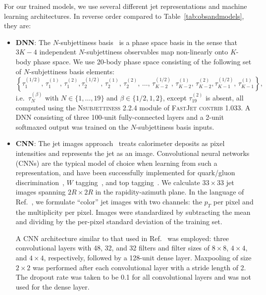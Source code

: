 \documentclass[letterpaper,11pt]{article}
\DeclareRobustCommand{\Tab}[1]{Table~\ref{#1}}
\DeclareRobustCommand{\Ref}[1]{Ref.~\cite{#1}}
\begin{document}
For our trained models, we use several different jet representations and machine learning architectures.
%
In reverse order compared to \Tab{tab:obsandmodels}, they are:
%
\begin{itemize}


\item \textbf{DNN}: The $N$-subjettiness basis~\cite{Datta:2017rhs} is a phase space basis in the sense that $3K-4$ independent $N$-subjettiness observables map non-linearly onto $K$-body phase space.
%
We use 20-body phase space consisting of the following set of $N$-subjettiness basis elements:
%
\begin{equation}
\left\{\tau_1^{(1/2)},\,\tau_1^{(1)},\,\tau_1^{(2)},\tau_2^{(1/2)},\,\tau_2^{(1)},\,\tau_2^{(2)},\,\ldots,\,\tau_{K-2}^{(1/2)},\,\tau_{K-2}^{(1)},\,\tau_{K-2}^{(2)},\tau_{K-1}^{(1/2)},\,\tau_{K-1}^{(1)}\right\},
\end{equation}
%
i.e.\ $\tau_N^{(\beta)}$ with $N\in\{1,\ldots,19\}$ and $\beta\in\{1/2,1,2\}$, except $\tau_{19}^{(2)}$ is absent, all computed using the \textsc{Nsubjettiness} 2.2.4 module of \textsc{FastJet contrib} 1.033.
%
A DNN consisting of three 100-unit fully-connected layers and a 2-unit softmaxed output was trained on the $N$-subjettiness basis inputs.


\item \textbf{CNN}: The jet images approach~\cite{Cogan:2014oua} treats calorimeter deposits as pixel intensities and represents the jet as an image. 
%
Convolutional neural networks (CNNs) are the typical model of choice when learning from such a representation, and have been successfully implemented for quark/gluon discrimination~\cite{Komiske:2016rsd}, $W$ tagging~\cite{deOliveira:2015xxd}, and top tagging~\cite{Baldi:2016fql,Guest:2016iqz}.
%
We calculate $33\times33$ jet images spanning $2R\times2R$ in the rapidity-azimuth plane.
%
In the language of \Ref{Komiske:2016rsd}, we formulate ``color'' jet images with two channels: the $p_T$ per pixel and the multiplicity per pixel.
%
Images were standardized by subtracting the mean and dividing by the per-pixel standard deviation of the training set.


A CNN architecture similar to that used in \Ref{Komiske:2016rsd} was employed: three convolutional layers with 48, 32, and 32 filters and filter sizes of $8\times 8$, $4\times 4$, and $4\times 4$, respectively, followed by a 128-unit dense layer. 
%
Maxpooling of size $2\times2$ was performed after each convolutional layer with a stride length of 2.
%
The dropout rate was taken to be 0.1 for all convolutional layers and was not used for the dense layer.



\end{itemize}
\end{document}
